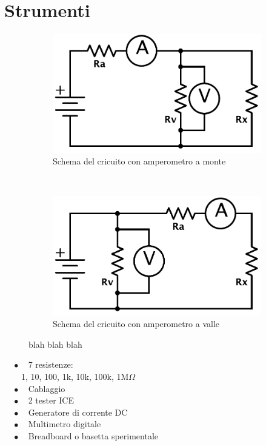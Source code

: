 \section{Strumenti}
\begin{figure}
    \centering
    \begin{subfigure}[h]{0.3\textwidth}
        \includegraphics[width=\textwidth]{R_monte.pdf}
        \caption{Schema del cricuito con amperometro a monte}
        \label{fig:monte}
    \end{subfigure}%
    ~ %
    \begin{subfigure}[h]{0.3\textwidth}
        \includegraphics[width=\textwidth]{R_valle.pdf}
        \caption{Schema del cricuito con amperometro a valle}
        \label{fig:valle}
    \end{subfigure}%
    \caption{blah blah blah}
    \label{fig:circuiti}
\end{figure}


$\quad \bullet \quad$7 resistenze:\\
$\quad \quad$1, 10, 100, 1k, 10k, 100k, 1M$\Omega$\\
$\quad \bullet \quad$Cablaggio\\
$\quad \bullet \quad$2 tester ICE\\
$\quad \bullet \quad$Generatore di corrente DC\\
$\quad \bullet \quad$Multimetro digitale\\
$\quad \bullet \quad$Breadboard o basetta sperimentale\\

